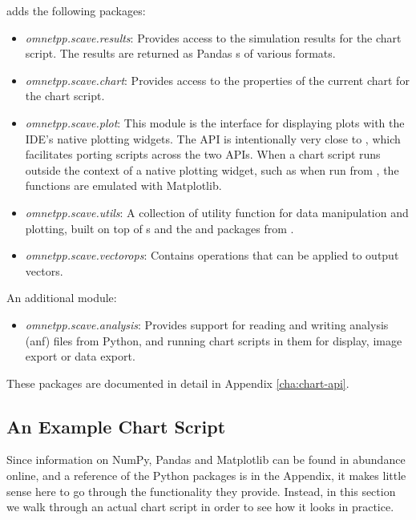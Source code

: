 {\opp} adds the following packages:

\begin{itemize}
  \item \textit{omnetpp.scave.results}: Provides access to the simulation
    results for the chart script. The results are returned as Pandas
    s of various formats.
  \item \textit{omnetpp.scave.chart}: Provides access to the properties of the
    current chart for the chart script.
  \item \textit{omnetpp.scave.plot}: This module is the interface for displaying
    plots with the IDE's native plotting widgets. The API is intentionally very
    close to , which facilitates porting scripts across
    the two APIs. When a chart script runs outside the context of a native
    plotting widget, such as when run from , the functions
    are emulated with Matplotlib.
  \item \textit{omnetpp.scave.utils}: A collection of utility function for data
    manipulation and plotting, built on top of s and the 
    and  packages from .
  \item \textit{omnetpp.scave.vectorops}: Contains operations that can be
    applied to output vectors.
\end{itemize}

An additional module:

\begin{itemize}
  \item \textit{omnetpp.scave.analysis}: Provides support for reading and writing
   analysis (anf) files from Python, and running chart scripts in them for display,
   image export or data export.
\end{itemize}

These packages are documented in detail in Appendix \ref{cha:chart-api}.


\subsection{An Example Chart Script}

Since information on NumPy, Pandas and Matplotlib can be found in abundance
online, and a reference of the  Python packages is in the
Appendix, it makes little sense here to go through the functionality they
provide. Instead, in this section we walk through an actual chart script in
order to see how it looks in practice.

